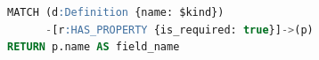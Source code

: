 \begin{lstlisting}[language=SQL, caption={Cypher \textit{query} untuk verifikasi \textit{required fields} pada Lapis 3 Validasi YAML}, label={lst:required-fields-query}, frame=single, captionpos=t]
MATCH (d:Definition {name: $kind})
      -[r:HAS_PROPERTY {is_required: true}]->(p)
RETURN p.name AS field_name
\end{lstlisting}
